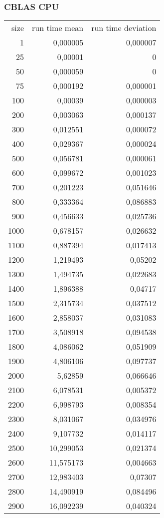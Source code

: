 \subsubsection{CBLAS CPU}

\begin{tabular}{r r r}
size & run time mean & run time deviation \\
1 & 0,000005 & 0,000007 \\
25 & 0,00001 & 0 \\
50 & 0,000059 & 0 \\
75 & 0,000192 & 0,000001 \\
100 & 0,00039 & 0,000003 \\
200 & 0,003063 & 0,000137 \\
300 & 0,012551 & 0,000072 \\
400 & 0,029367 & 0,000024 \\
500 & 0,056781 & 0,000061 \\
600 & 0,099672 & 0,001023 \\
700 & 0,201223 & 0,051646 \\
800 & 0,333364 & 0,086883 \\
900 & 0,456633 & 0,025736 \\
1000 & 0,678157 & 0,026632 \\
1100 & 0,887394 & 0,017413 \\
1200 & 1,219493 & 0,05202 \\
1300 & 1,494735 & 0,022683 \\
1400 & 1,896388 & 0,04717 \\
1500 & 2,315734 & 0,037512 \\
1600 & 2,858037 & 0,031083 \\
1700 & 3,508918 & 0,094538 \\
1800 & 4,086062 & 0,051909 \\
1900 & 4,806106 & 0,097737 \\
2000 & 5,62859 & 0,066646 \\
2100 & 6,078531 & 0,005372 \\
2200 & 6,998793 & 0,008354 \\
2300 & 8,031067 & 0,034976 \\
2400 & 9,107732 & 0,014117 \\
2500 & 10,299053 & 0,021374 \\
2600 & 11,575173 & 0,004663 \\
2700 & 12,983403 & 0,07307 \\
2800 & 14,490919 & 0,084496 \\
2900 & 16,092239 & 0,040324 \\

\end{tabular}
